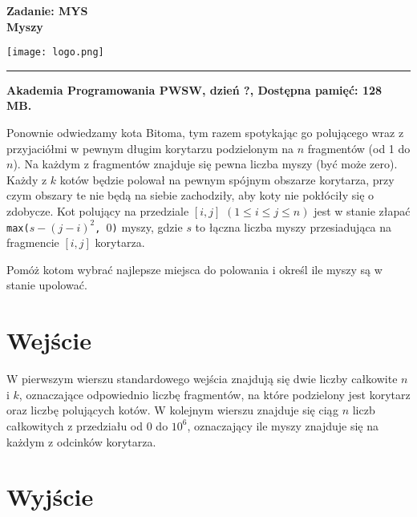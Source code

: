 \documentclass[10pt]{article}
\begin{document}
    

    \noindent
    \begin{minipage}{0.5\textwidth}
        \LARGE{\textsf{\textbf{Zadanie: MYS\\Myszy}}}
    \end{minipage}
    \begin{minipage}{0.5\textwidth}
        \begin{flushright}
            \texttt{[image: logo.png]}
        \end{flushright}
    \end{minipage}
    
    \noindent\rule{\textwidth}{0.4pt}
    
    \noindent\textbf{Akademia Programowania PWSW, dzień ?, Dostępna pamięć: 128 MB.}
    \vspace{1em}
    
    
    \noindent
    Ponownie odwiedzamy kota Bitoma, tym razem spotykając go polującego wraz z przyjaciółmi w pewnym długim korytarzu podzielonym na $n$ fragmentów (od 1 do $n$). Na każdym z fragmentów znajduje się pewna liczba myszy (być może zero). Każdy z $k$ kotów będzie polował na pewnym spójnym obszarze korytarza, przy czym obszary te nie będą na siebie zachodziły, aby koty nie pokłóciły się o zdobycze. Kot polujący na przedziale $[i, j]$ $(1\leq i\leq j\leq n)$ jest w stanie złapać \texttt{max($s - (j - i)^{2}$, $0$)} myszy, gdzie $s$ to łączna liczba myszy przesiadująca na fragmencie $[i, j]$ korytarza.
    
    Pomóż kotom wybrać najlepsze miejsca do polowania i określ ile myszy są w stanie upolować.
    


    \section*{Wejście}
    
    W pierwszym wierszu standardowego wejścia znajdują się dwie liczby całkowite $n$ i $k$, oznaczające odpowiednio liczbę fragmentów, na które podzielony jest korytarz oraz liczbę polujących kotów. W kolejnym wierszu znajduje się ciąg $n$ liczb całkowitych z przedziału od 0 do $10^{6}$, oznaczający ile myszy znajduje się na każdym z odcinków korytarza.


    \section*{Wyjście}
    
\end{document}
